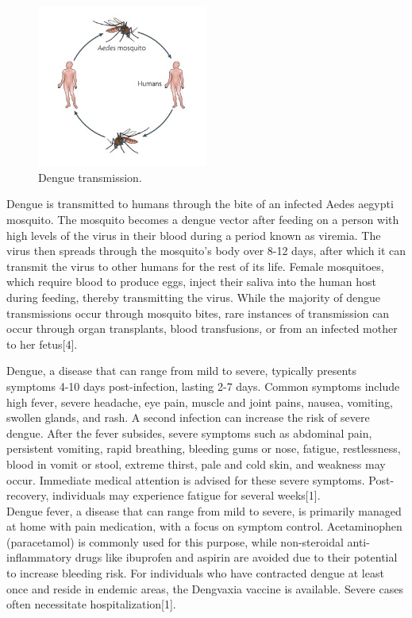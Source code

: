 \documentclass[conference]{IEEEtran}
\begin{document}
\begin{figure}[htbp]
    \centering
    \includegraphics[width=0.5\textwidth]{fig2.png}
    \caption{Dengue transmission.}
\end{figure}

Dengue is transmitted to humans through the bite of an infected Aedes aegypti mosquito.
The mosquito becomes a dengue vector after feeding on a person with high levels of the virus
in their blood during a period known as viremia. The virus then spreads through the
mosquito’s body over 8-12 days, after which it can transmit the virus to other humans for
the rest of its life. Female mosquitoes, which require blood to produce eggs, inject their
saliva into the human host during feeding, thereby transmitting the virus. While the
majority of dengue transmissions occur through mosquito bites, rare instances of transmission
can occur through organ transplants, blood transfusions, or from an infected mother to her
fetus[4].

Dengue, a disease that can range from mild to severe, typically presents
symptoms 4-10 days post-infection, lasting 2-7 days. Common symptoms
include high fever, severe headache, eye pain, muscle and joint pains,
nausea, vomiting, swollen glands, and rash. A second infection
can increase the risk of severe dengue. After the fever subsides,
severe symptoms such as abdominal pain, persistent vomiting, rapid breathing,
bleeding gums or nose, fatigue, restlessness, blood in vomit or stool,
extreme thirst, pale and cold skin, and weakness may occur. Immediate
medical attention is advised for these severe symptoms. Post-recovery,
individuals may experience fatigue for several weeks[1]. \\

Dengue fever, a disease that can range from mild to severe, is primarily
managed at home with pain medication, with a focus on symptom control.
Acetaminophen (paracetamol) is commonly used for this purpose, while
non-steroidal anti-inflammatory drugs like ibuprofen and aspirin are
avoided due to their potential to increase bleeding risk. For individuals
who have contracted dengue at least once and reside in endemic areas,
the Dengvaxia vaccine is available. Severe cases often necessitate
hospitalization[1]. \\
\end{document}
